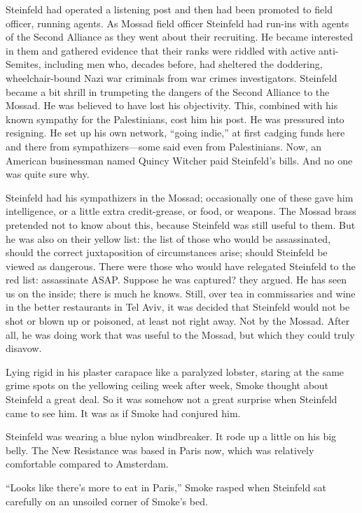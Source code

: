 Steinfeld had operated a listening post and then had been promoted to field officer, running agents. As Mossad field officer Steinfeld had run-ins with agents of the Second Alliance as they went about their recruiting. He became interested in them and gathered evidence that their ranks were riddled with active anti-Semites, including men who, decades before, had sheltered the doddering, wheelchair-bound Nazi war criminals from war crimes investigators. Steinfeld became a bit shrill in trumpeting the dangers of the Second Alliance to the Mossad. He was believed to have lost his objectivity. This, combined with his known sympathy for the Palestinians, cost him his post. He was pressured into resigning. He set up his own network, ``going indie,'' at first cadging funds here and there from sympathizers—some said even from Palestinians. Now, an American businessman named Quincy Witcher paid Steinfeld's bills. And no one was quite sure why.

Steinfeld had his sympathizers in the Mossad; occasionally one of these gave him intelligence, or a little extra credit-grease, or food, or weapons. The Mossad brass pretended not to know about this, because Steinfeld was still useful to them. But he was also on their yellow list: the list of those who would be assassinated, should the correct juxtaposition of circumstances arise; should Steinfeld be viewed as dangerous. There were those who would have relegated Steinfeld to the red list: assassinate ASAP. Suppose he was captured? they argued. He has seen us on the inside; there is much he knows. Still, over tea in commissaries and wine in the better restaurants in Tel Aviv, it was decided that Steinfeld would not be shot or blown up or poisoned, at least not right away. Not by the Mossad. After all, he was doing work that was useful to the Mossad, but which they could truly disavow.

Lying rigid in his plaster carapace like a paralyzed lobster, staring at the same grime spots on the yellowing ceiling week after week, Smoke thought about Steinfeld a great deal. So it was somehow not a great surprise when Steinfeld came to see him. It was as if Smoke had conjured him.

Steinfeld was wearing a blue nylon windbreaker. It rode up a little on his big belly. The New Resistance was based in Paris now, which was relatively comfortable compared to Amsterdam.

``Looks like there's more to eat in Paris,'' Smoke rasped when Steinfeld sat carefully on an unsoiled corner of Smoke's bed.

